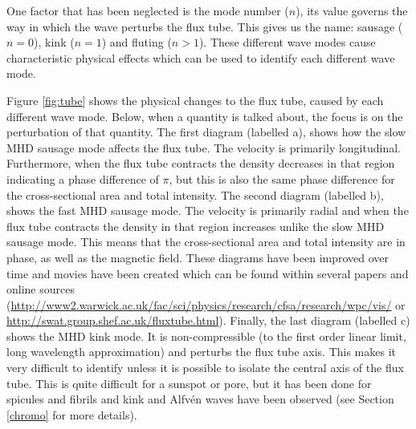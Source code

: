     One factor that has been neglected is the mode number ($n$), its value governs the way in which the wave perturbs the flux tube.
    This gives us the name: sausage ($n=0$), kink ($n=1$) and fluting ($n>1$).
    These different wave modes cause characteristic physical effects which can be used to identify each different wave mode.
    
    Figure \ref{fig:tube} shows the physical changes to the flux tube, caused by each different wave mode.
    Below, when a quantity is talked about, the focus is on the perturbation of that quantity.
    The first diagram (labelled a), shows how the slow MHD sausage mode affects the flux tube. 
    The velocity is primarily longitudinal.
    Furthermore, when the flux tube contracts the density decreases in that region indicating a phase difference of $\pi$, but this is also the same phase difference for the cross-sectional area and total intensity.
    The second diagram (labelled b), shows the fast MHD sausage mode.
    The velocity is primarily radial and when the flux tube contracts the density in that region increases unlike the slow MHD sausage mode.
    This means that the cross-sectional area and total intensity are in phase, as well as the magnetic field.
    These diagrams have been improved over time and movies have been created which can be found within several papers \citep{Morton2012,jess2015multiwavelength} and online sources (\url{http://www2.warwick.ac.uk/fac/sci/physics/research/cfsa/research/wpc/vis/} or \url{http://swat.group.shef.ac.uk/fluxtube.html}).
    Finally, the last diagram (labelled c) shows the MHD kink mode.
    It is non-compressible (to the first order linear limit, long wavelength approximation) and perturbs the flux tube axis.
    This makes it very difficult to identify unless it is possible to isolate the central axis of the flux tube.
    This is quite difficult for a sunspot or pore, but it has been done for spicules and fibrils and  kink and Alfv\'en waves have been observed (see Section \ref{chromo} for more details).
    
